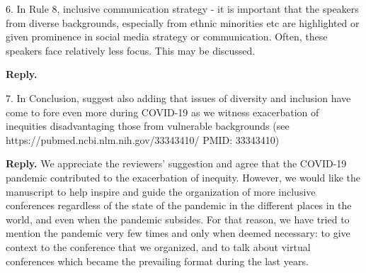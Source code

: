 \documentclass{article}
\newenvironment{Reply}{\noindent\color{BlueViolet}\textbf{Reply.}}{\vspace{1em}}
\begin{document}
6. In Rule 8, inclusive communication strategy - it is important that the speakers from diverse backgrounds, especially from ethnic minorities etc are highlighted or given prominence in social media strategy or communication. Often, these speakers face relatively less focus. This may be discussed.

\begin{Reply}
   
\end{Reply}

7. In Conclusion, suggest also adding that issues of diversity and inclusion have come to fore even more during COVID-19 as we witness exacerbation of inequities disadvantaging those from vulnerable backgrounds (see https://pubmed.ncbi.nlm.nih.gov/33343410/
PMID: 33343410)

\begin{Reply}
    We appreciate the reviewers' suggestion and agree that the COVID-19 pandemic contributed to the exacerbation of inequity. 
    However, we would like the manuscript to help inspire and guide the organization of more inclusive conferences regardless of the state of the pandemic in the different places in the world, and even when the pandemic subsides. For that reason, we have tried to mention the pandemic very few times and only when deemed necessary: to give context to the conference that we organized, and to talk about virtual conferences which became the prevailing format during the last years.  
\end{Reply}
\end{document}
